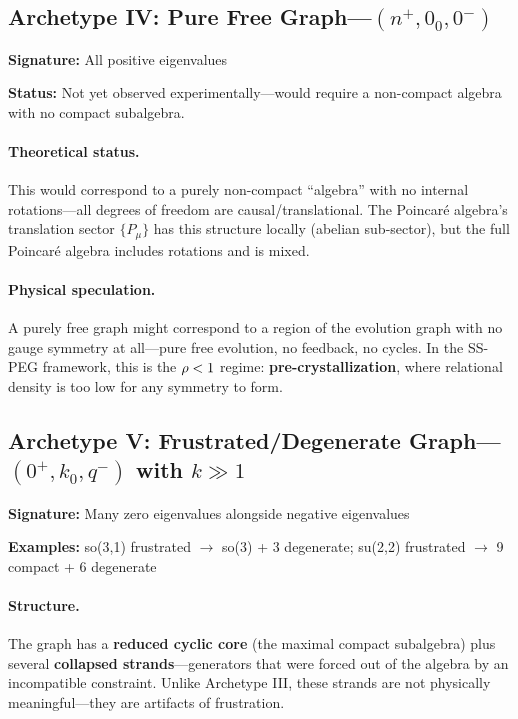 \subsection{Archetype IV: Pure Free Graph---$(n^+, 0_0, 0^-)$}\label{sec:archetype_IV}

\textbf{Signature:} All positive eigenvalues

\textbf{Status:} Not yet observed experimentally---would require a non-compact algebra with no compact subalgebra.

\paragraph{Theoretical status.} This would correspond to a purely non-compact ``algebra'' with no internal rotations---all degrees of freedom are causal/translational. The Poincar\'e algebra's translation sector $\{P_\mu\}$ has this structure locally (abelian sub-sector), but the full Poincar\'e algebra includes rotations and is mixed.

\paragraph{Physical speculation.} A purely free graph might correspond to a region of the evolution graph with no gauge symmetry at all---pure free evolution, no feedback, no cycles. In the SS-PEG framework, this is the $\rho < 1$ regime: \textbf{pre-crystallization}, where relational density is too low for any symmetry to form.

\subsection{Archetype V: Frustrated/Degenerate Graph---$(0^+, k_0, q^-)$ with $k \gg 1$}\label{sec:archetype_V}

\textbf{Signature:} Many zero eigenvalues alongside negative eigenvalues

\textbf{Examples:} so(3,1) frustrated $\to$ so(3) + 3 degenerate; su(2,2) frustrated $\to$ 9 compact + 6 degenerate

\paragraph{Structure.} The graph has a \textbf{reduced cyclic core} (the maximal compact subalgebra) plus several \textbf{collapsed strands}---generators that were forced out of the algebra by an incompatible constraint. Unlike Archetype III, these strands are not physically meaningful---they are artifacts of frustration.

